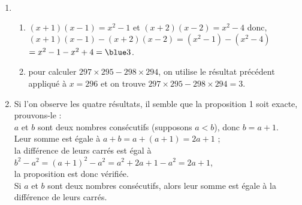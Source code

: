 \ \\ [-5mm]
   \begin{enumerate}
      \item
      \begin{enumerate}
         \item $(x+1)(x-1) =x^2-1$ et $(x+2)(x-2) =x^2-4$ donc, \\
            $(x+1)(x-1)-(x+2)(x-2) =(x^2-1)-(x^2-4)$ \\
            \hspace*{4.35cm} $=x^2-1-x^2+4 ={\blue 3}$.
         \item pour calculer $297\times295-298\times294$, on utilise le résultat précédent appliqué à $x =296$ et on trouve {\blue $297\times295-298\times294 =3$}.
      \end{enumerate}
      \setcounter{enumi}{1}
      \item Si l'on observe les quatre résultats, il semble que la proposition 1 soit exacte, prouvons-le : \\
         $a$ et $b$ sont deux nombres consécutifs (supposons $a<b$), donc $b =a+1$. \\
         Leur somme est égale à $a+b =a+(a+1) =2a+1$ ; \\
         la différence de leurs carrés est égal à $b^2-a^2 =(a+1)^2-a^2 =a^2+2a+1-a^2 =2a+1$, \\
            la proposition est donc vérifiée. \\
           {\blue Si $a$ et $b$ sont deux nombres consécutifs, alors leur somme est égale à la différence de leurs carrés}.
   \end{enumerate}
